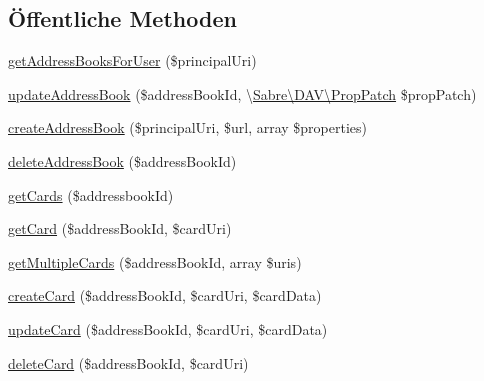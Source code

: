 \subsection*{Öffentliche Methoden}
\begin{DoxyCompactItemize}
\item 
\mbox{\hyperlink{interface_sabre_1_1_card_d_a_v_1_1_backend_1_1_backend_interface_a47302ae5f71c46e7e729f20fb4be65ec}{get\+Address\+Books\+For\+User}} (\$principal\+Uri)
\item 
\mbox{\hyperlink{interface_sabre_1_1_card_d_a_v_1_1_backend_1_1_backend_interface_a3cc3f076e53032bd38ea272353df4899}{update\+Address\+Book}} (\$address\+Book\+Id, \textbackslash{}\mbox{\hyperlink{class_sabre_1_1_d_a_v_1_1_prop_patch}{Sabre\textbackslash{}\+D\+A\+V\textbackslash{}\+Prop\+Patch}} \$prop\+Patch)
\item 
\mbox{\hyperlink{interface_sabre_1_1_card_d_a_v_1_1_backend_1_1_backend_interface_a448b1c8ec1f0daaaa301bbc8e94ca32a}{create\+Address\+Book}} (\$principal\+Uri, \$url, array \$properties)
\item 
\mbox{\hyperlink{interface_sabre_1_1_card_d_a_v_1_1_backend_1_1_backend_interface_ae49e515bcce7a2b4f6b9d95dd6d575e9}{delete\+Address\+Book}} (\$address\+Book\+Id)
\item 
\mbox{\hyperlink{interface_sabre_1_1_card_d_a_v_1_1_backend_1_1_backend_interface_aa616e3059b786eb7d97340f8527c4e3c}{get\+Cards}} (\$addressbook\+Id)
\item 
\mbox{\hyperlink{interface_sabre_1_1_card_d_a_v_1_1_backend_1_1_backend_interface_a01e1ff7122fa275f20cbae9f5bb0fff6}{get\+Card}} (\$address\+Book\+Id, \$card\+Uri)
\item 
\mbox{\hyperlink{interface_sabre_1_1_card_d_a_v_1_1_backend_1_1_backend_interface_acfd14d115d8d4a064fc746c8bebb75f5}{get\+Multiple\+Cards}} (\$address\+Book\+Id, array \$uris)
\item 
\mbox{\hyperlink{interface_sabre_1_1_card_d_a_v_1_1_backend_1_1_backend_interface_ad37206b24b501cd47594af594c3e3401}{create\+Card}} (\$address\+Book\+Id, \$card\+Uri, \$card\+Data)
\item 
\mbox{\hyperlink{interface_sabre_1_1_card_d_a_v_1_1_backend_1_1_backend_interface_a56f24a21facd52a79d65ee9fc893688f}{update\+Card}} (\$address\+Book\+Id, \$card\+Uri, \$card\+Data)
\item 
\mbox{\hyperlink{interface_sabre_1_1_card_d_a_v_1_1_backend_1_1_backend_interface_ac48343c04095e3e3a509da9f5b65ae0a}{delete\+Card}} (\$address\+Book\+Id, \$card\+Uri)
\end{DoxyCompactItemize}


